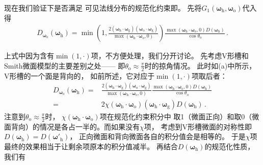 现在我们验证下是否满足
可见法线分布的规范化约束即。
先将$G_1({\bm\omega}_{\mathrm{h}},{\bm\omega}_{\mathrm{o}})$代入得
\begin{align}
    D_{{\bm\omega}_{\mathrm{o}}}({\bm\omega}_{\mathrm{h}})
    =\min\left(1, \frac{2({\bm\omega}_{\mathrm{h}}\cdot{\bm\omega}_{\mathrm{g}})
    ({\bm\omega}_{\mathrm{o}}\cdot{\bm\omega}_{\mathrm{g}})}
    {\max({\bm\omega}_{\mathrm{h}}\cdot{\bm\omega}_{\mathrm{o}},0)}\right)
    \frac{\max({\bm\omega}_{\mathrm{h}}\cdot{\bm\omega}_{\mathrm{o}},0)
        D({\bm\omega}_{\mathrm{h}})}{\cos\theta_{\mathrm{o}}}\, .
\end{align}

上式中因为含有$\min(1,\cdot)$项，不方便处理，我们分开讨论。
先考虑V形槽和Smith微面模型的主要差别之处——
即$\displaystyle\theta_{\mathrm{o}}\approx\frac{\pi}{2}$时的掠角情况。
此时如(a)中所示，V形槽的一个面是背向的，
如前所述，它对应于$\min(1,\cdot)$项取后者：
\begin{align}
    D_{{\bm\omega}_{\mathrm{o}}}({\bm\omega}_{\mathrm{h}})
    = & \frac{2({\bm\omega}_{\mathrm{h}}\cdot{\bm\omega}_{\mathrm{g}})
    ({\bm\omega}_{\mathrm{o}}\cdot{\bm\omega}_{\mathrm{g}})}
    {\max({\bm\omega}_{\mathrm{h}}\cdot{\bm\omega}_{\mathrm{o}},0)}
    \frac{\max({\bm\omega}_{\mathrm{h}}\cdot{\bm\omega}_{\mathrm{o}},0)
        D({\bm\omega}_{\mathrm{h}})}{\cos\theta_{\mathrm{o}}}\nonumber \\
    = & 2\chi({\bm\omega}_{\mathrm{h}}\cdot{\bm\omega}_{\mathrm{o}})
    ({\bm\omega}_{\mathrm{h}}\cdot{\bm\omega}_{\mathrm{g}})
    D({\bm\omega}_{\mathrm{h}})\, .
\end{align}
注意到$\displaystyle\theta_{\mathrm{o}}\approx\frac{\pi}{2}$时，
$\chi({\bm\omega}_{\mathrm{h}}\cdot{\bm\omega}_{\mathrm{o}})$项在规范化约束积分中
取1（微面正向）和取0（微面背向）的情况是各占一半的。而如果没有$\chi$项，
考虑到V形槽微面的对称性即$D({\bm\omega}_{\mathrm{h}})=D({\bm\omega}'_{\mathrm{h}})$，
正向微面和背向微面各自的积分值会是相等的。
于是$\chi$项最终的效果相当于让剩余项原本的积分值减半。
再结合$D({\bm\omega}_{\mathrm{h}})$的规范化性质，
我们有
